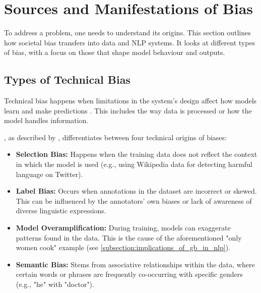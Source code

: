 \section{Sources and Manifestations of Bias}

To address a problem, one needs to understand its origins. This section outlines how societal bias transfers into data and NLP systems. It looks at different types of bias, with a focus on those that shape model behaviour and outputs.

\subsection{Types of Technical Bias}
Technical bias happens when limitations in the system's design affect how models learn and make predictions \citep{stanczakSurveyGenderBias2021}. This includes the way data is processed or how the model handles information.

\citet{shahPredictiveBiasesNatural2020}, as described by \citet{ullmannGenderBiasMachine2022}, differentiates between four technical origins of biases:

\begin{itemize}
    \item \textbf{Selection Bias:} Happens when the training data does not reflect the context in which the model is used (e.g., using Wikipedia data for detecting harmful language on Twitter).
    
    \item \textbf{Label Bias:} Occurs when annotations in the dataset are incorrect or skewed. This can be influenced by the annotators' own biases or lack of awareness of diverse linguistic expressions.

    \item \textbf{Model Overamplification:} During training, models can exaggerate patterns found in the data. This is the cause of the aforementioned "only women cook" example (see \autoref{subsection:implications_of_gb_in_nlp}).

    \item \textbf{Semantic Bias:} Stems from associative relationships within the data, where certain words or phrases are frequently co-occurring with specific genders (e.g., "he" with "doctor").
\end{itemize}

